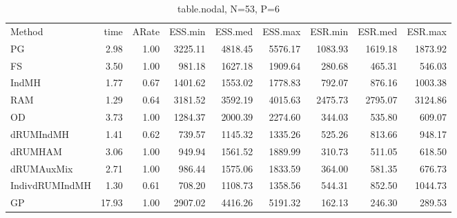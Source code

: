 
\begin{table}
\label{tab:blogit-nodal}
\begin{tabular}{l r r r r r r r r } 
          Method  &     time &    ARate &  ESS.min &  ESS.med &  ESS.max &  ESR.min &  ESR.med &  ESR.max \\ 
              PG  &     2.98 &     1.00 &  3225.11 &  4818.45 &  5576.17 &  1083.93 &  1619.18 &  1873.92 \\ 
              FS  &     3.50 &     1.00 &   981.18 &  1627.18 &  1909.64 &   280.68 &   465.31 &   546.03 \\ 
           IndMH  &     1.77 &     0.67 &  1401.62 &  1553.02 &  1778.83 &   792.07 &   876.16 &  1003.38 \\ 
             RAM  &     1.29 &     0.64 &  3181.52 &  3592.19 &  4015.63 &  2475.73 &  2795.07 &  3124.86 \\ 
              OD  &     3.73 &     1.00 &  1284.37 &  2000.39 &  2274.60 &   344.03 &   535.80 &   609.07 \\ 
       dRUMIndMH  &     1.41 &     0.62 &   739.57 &  1145.32 &  1335.26 &   525.26 &   813.66 &   948.17 \\ 
         dRUMHAM  &     3.06 &     1.00 &   949.94 &  1561.52 &  1889.99 &   310.73 &   511.05 &   618.50 \\ 
      dRUMAuxMix  &     2.71 &     1.00 &   986.44 &  1575.06 &  1833.59 &   364.00 &   581.35 &   676.73 \\ 
  IndivdRUMIndMH  &     1.30 &     0.61 &   708.20 &  1108.73 &  1358.56 &   544.31 &   852.50 &  1044.73 \\ 
              GP  &    17.93 &     1.00 &  2907.02 &  4416.26 &  5191.32 &   162.13 &   246.30 &   289.53
 \end{tabular}
\caption{table.nodal, N=53, P=6}
\end{table}


